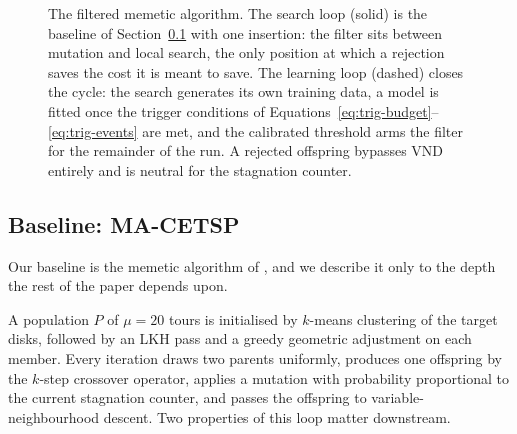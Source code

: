 \documentclass[a4paper,fleqn]{cas-dc}
\begin{document}
\begin{figure}[!tbp]
\caption{The filtered memetic algorithm. The search loop (solid) is the baseline
of Section~\ref{sec:fw-baseline} with one insertion: the filter sits between
mutation and local search, the only position at which a rejection saves the cost
it is meant to save. The learning loop (dashed) closes the cycle: the search
generates its own training data, a model is fitted once the trigger conditions of
Equations~\eqref{eq:trig-budget}--\eqref{eq:trig-events} are met, and the
calibrated threshold arms the filter for the remainder of the run. A rejected
offspring bypasses VND entirely and is neutral for the stagnation counter.}
\label{fig:architecture}
\end{figure}

\subsection{Baseline: MA-CETSP}\label{sec:fw-baseline}

Our baseline is the memetic algorithm of \citet{LEI2024111266}, and we describe
it only to the depth the rest of the paper depends upon.

A population $P$ of $\mu = 20$ tours is initialised by $k$-means clustering of
the target disks, followed by an LKH pass and a greedy geometric adjustment on
each member. Every iteration draws two parents uniformly, produces one offspring
by the $k$-step crossover operator, applies a mutation with probability
proportional to the current stagnation counter, and passes the offspring to
variable-neighbourhood descent. Two properties of this loop matter downstream.
\end{document}
